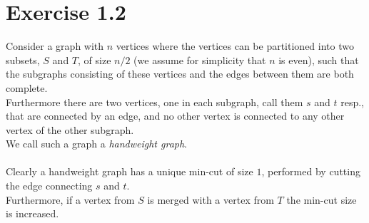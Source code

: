 
%
%
%
%
%

%
\section*{Exercise 1.2}
Consider a graph with $n$ vertices where the vertices can be partitioned into two subsets, $S$ and $T$, of size $n/2$
(we assume for simplicity that $n$ is even), 
such that the subgraphs consisting of these vertices and the edges between them are both complete. \\
Furthermore there are two vertices, one in each subgraph, call them $s$ and $t$ resp., 
that are connected by an edge,
and no other vertex is connected to any other vertex of the other subgraph. \\
We call such a graph a \textit{handweight graph}. \\ \\
Clearly a handweight graph has a unique min-cut of size $1$, performed by cutting the edge connecting $s$ and $t$. \\
Furthermore, if a vertex from $S$ is merged with a vertex from $T$ the min-cut size is increased.

